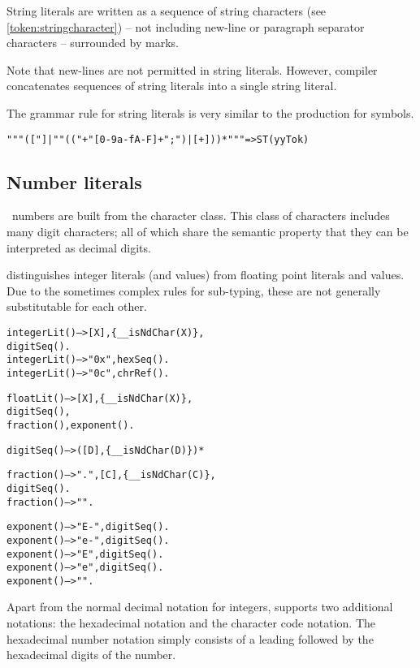String literals are written as a sequence of string characters (see \ref{token:stringcharacter}) -- not including new-line or paragraph separator characters -- surrounded by  marks.

\begin{aside}
Note that new-lines are not permitted in string literals. However, \go compiler concatenates sequences of string literals into a single string literal.
\end{aside}
The grammar rule for string literals is very similar to the production for symbols.

\begin{alltt}
"\bsl""([\uphat\bsl\bsl"]|"\bsl\bsl"(("+"[0-9a-fA-F]+";")|[\uphat+]))*"\bsl"" => ST(yyTok)

\end{alltt}

\subsection{Number literals}
\label{token:number}

\go\ numbers are built from the  character class. This class of characters includes many digit characters; all of which share the semantic property that they can be interpreted as decimal digits.

\go distinguishes integer literals (and values) from floating point literals and values. Due to the sometimes complex rules for sub-typing, these are not generally substitutable for each other.

\begin{alltt}
integerLit() --> [X],\{__isNdChar(X)\},
    digitSeq().
integerLit() --> "0x", hexSeq().
integerLit() --> "0c", chrRef().
    
floatLit() --> [X],\{__isNdChar(X)\},
     digitSeq(),
    fraction(),exponent().

digitSeq() --> ([D],\{\_\_isNdChar(D)\})*

fraction() --> ".", [C],\{\_\_isNdChar(C)\},
        digitSeq().
fraction() --> "".

exponent() --> "E-", digitSeq().
exponent() --> "e-", digitSeq().
exponent() --> "E", digitSeq().
exponent() --> "e", digitSeq().
exponent() --> "".
\end{alltt}
Apart from the normal decimal notation for integers, \go supports two additional notations: the hexadecimal notation and the character code notation. The hexadecimal number notation simply consists of a leading  followed by the hexadecimal digits of the number.

